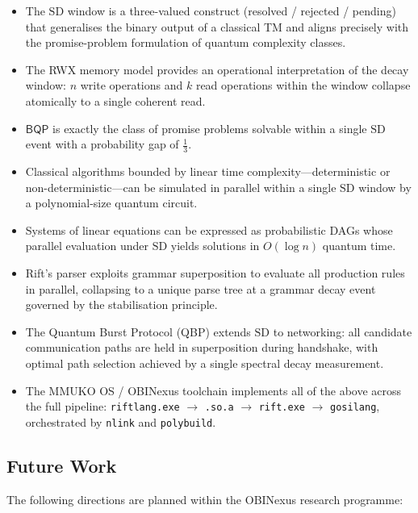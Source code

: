 \documentclass[11pt]{article}
\theoremstyle{plain}
\theoremstyle{definition}
\theoremstyle{remark}
\newcommand{\bqp}{\ensuremath{\mathsf{BQP}}}
\newcommand{\SD}{\ensuremath{\mathrm{SD}}}   %
\begin{document}
\begin{itemize}
  \item The \SD{} window is a three-valued construct (resolved / rejected /
        pending) that generalises the binary output of a classical TM and
        aligns precisely with the promise-problem formulation of quantum
        complexity classes.
  \item The RWX memory model provides an operational interpretation of the
        decay window: $n$ write operations and $k$ read operations within
        the window collapse atomically to a single coherent read.
  \item $\bqp$ is exactly the class of promise problems solvable within a
        single \SD{} event with a probability gap of $\tfrac{1}{3}$.
  \item Classical algorithms bounded by linear time complexity---deterministic
        or non-deterministic---can be simulated in parallel within a single
        \SD{} window by a polynomial-size quantum circuit.
  \item Systems of linear equations can be expressed as probabilistic DAGs
        whose parallel evaluation under \SD{} yields solutions in
        $O(\log n)$ quantum time.
  \item Rift's parser exploits grammar superposition to evaluate all
        production rules in parallel, collapsing to a unique parse tree at a
        grammar decay event governed by the stabilisation principle.
  \item The Quantum Burst Protocol (QBP) extends \SD{} to networking: all
        candidate communication paths are held in superposition during
        handshake, with optimal path selection achieved by a single spectral
        decay measurement.
  \item The MMUKO OS / OBINexus toolchain implements all of the above across
        the full pipeline: \texttt{riftlang.exe} $\to$ \texttt{.so.a} $\to$
        \texttt{rift.exe} $\to$ \texttt{gosilang}, orchestrated by
        \texttt{nlink} and \texttt{polybuild}.
\end{itemize}

\subsection{Future Work}

The following directions are planned within the OBINexus research programme:
\end{document}
